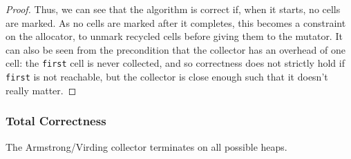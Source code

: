 \begin{proof}
  Thus, we can see that the algorithm is correct if, when it starts,
  no cells are marked. As no cells are marked after it completes, this
  becomes a constraint on the allocator, to unmark recycled cells
  before giving them to the mutator. It can also be seen from the
  precondition that the collector has an overhead of one cell: the
  \texttt{first} cell is never collected, and so correctness does not
  strictly hold if \texttt{first} is not reachable, but the collector
  is close enough such that it doesn't really matter.
\end{proof}

\subsubsection{Total Correctness}
\label{sec:marksweep-example-total}

\begin{theorem}
  The Armstrong/Virding collector terminates on all possible heaps.
\end{theorem}

